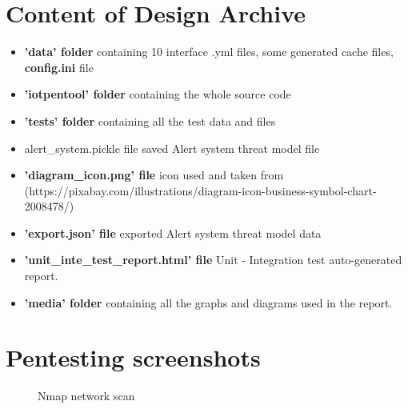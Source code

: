 \documentclass{article}
\begin{document}
\section{Content of Design Archive}
\begin{itemize}
	\item \textbf{'data' folder} containing 10 interface .yml files, some generated cache files, \textbf{config.ini} file
	\item \textbf{'iotpentool' folder} containing the whole source code
	\item \textbf{'tests' folder} containing all the test data and files
	\item alert\_system.pickle file saved Alert system threat model file
	\item \textbf{'diagram\_icon.png' file} icon used and taken from (https://pixabay.com/illustrations/diagram-icon-business-symbol-chart-2008478/)
	\item \textbf{'export.json' file} exported Alert system threat model data
	\item \textbf{'unit\_inte\_test\_report.html' file} Unit - Integration test auto-generated report.
	\item \textbf{'media' folder} containing all the graphs and diagrams used in the report.
\end{itemize}


\section{Pentesting screenshots}\label{sec:appendix-pen-testing}

\begin{figure}[!htb]
	\caption{Nmap network scan}
\end{figure}
\end{document}
